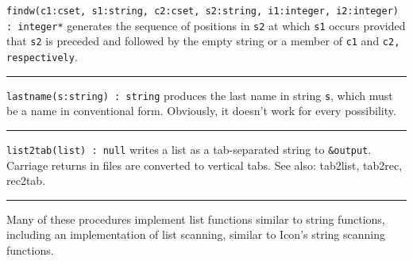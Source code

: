 \texttt{findw(c1:cset, s1:string, c2:cset, s2:string, i1:integer,
i2:integer) : integer*} generates the sequence of positions in
\texttt{s2} at which \texttt{s1} occurs provided that \texttt{s2} is
preceded and followed by the empty string or a member of \texttt{c1}
and \texttt{c2, respectively}.

\vspace{0.25cm}\hrule{}

\texttt{lastname(s:string) : string} produces the last name in string
\texttt{s}, which must be a name in conventional form. Obviously, it
doesn't work for every possibility. 

\vspace{0.25cm}\hrule{}

\texttt{list2tab(list) : null} writes a list as a tab-separated string
to \texttt{\&output}. Carriage returns in files are converted to
vertical tabs.
See also: tab2list, tab2rec, rec2tab. 

\vspace{0.25cm}\hrule{}

Many of these procedures implement list functions
similar to string functions, including an implementation of
list scanning, similar to Icon's
string scanning functions.

